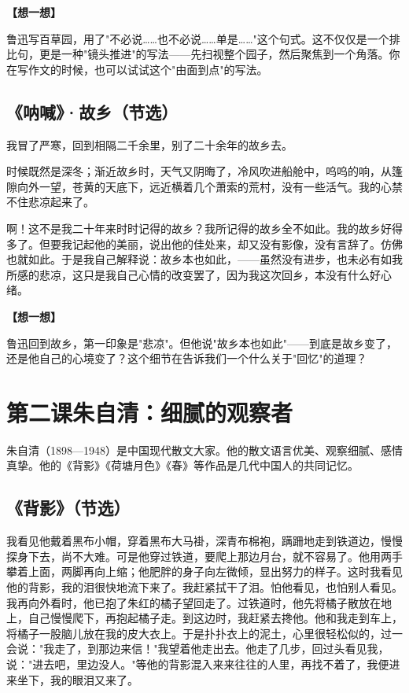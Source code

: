 \documentclass[a4paper,12pt]{ctexart}
\newcommand{\thinkq}{\vspace{0.2cm}\noindent\textcolor{orange!60!black}{\small\bfseries【想一想】}\par}
\begin{document}
\thinkq 鲁迅写百草园，用了"不必说……也不必说……单是……"这个句式。这不仅仅是一个排比句，更是一种"镜头推进"的写法——先扫视整个园子，然后聚焦到一个角落。你在写作文的时候，也可以试试这个"由面到点"的写法。

\subsection*{《呐喊》·故乡（节选）}

我冒了严寒，回到相隔二千余里，别了二十余年的故乡去。

时候既然是深冬；渐近故乡时，天气又阴晦了，冷风吹进船舱中，呜呜的响，从篷隙向外一望，苍黄的天底下，远近横着几个萧索的荒村，没有一些活气。我的心禁不住悲凉起来了。

啊！这不是我二十年来时时记得的故乡？我所记得的故乡全不如此。我的故乡好得多了。但要我记起他的美丽，说出他的佳处来，却又没有影像，没有言辞了。仿佛也就如此。于是我自己解释说：故乡本也如此，——虽然没有进步，也未必有如我所感的悲凉，这只是我自己心情的改变罢了，因为我这次回乡，本没有什么好心绪。

\thinkq 鲁迅回到故乡，第一印象是"悲凉"。但他说"故乡本也如此"——到底是故乡变了，还是他自己的心境变了？这个细节在告诉我们一个什么关于"回忆"的道理？

\newpage

\section{\textcolor{orange!80!black}{第二课\quad 朱自清：细腻的观察者}}

朱自清（1898—1948）是中国现代散文大家。他的散文语言优美、观察细腻、感情真挚。他的《背影》《荷塘月色》《春》等作品是几代中国人的共同记忆。

\subsection*{《背影》（节选）}

我看见他戴着黑布小帽，穿着黑布大马褂，深青布棉袍，蹒跚地走到铁道边，慢慢探身下去，尚不大难。可是他穿过铁道，要爬上那边月台，就不容易了。他用两手攀着上面，两脚再向上缩；他肥胖的身子向左微倾，显出努力的样子。这时我看见他的背影，我的泪很快地流下来了。我赶紧拭干了泪。怕他看见，也怕别人看见。我再向外看时，他已抱了朱红的橘子望回走了。过铁道时，他先将橘子散放在地上，自己慢慢爬下，再抱起橘子走。到这边时，我赶紧去搀他。他和我走到车上，将橘子一股脑儿放在我的皮大衣上。于是扑扑衣上的泥土，心里很轻松似的，过一会说："我走了，到那边来信！"我望着他走出去。他走了几步，回过头看见我，说："进去吧，里边没人。"等他的背影混入来来往往的人里，再找不着了，我便进来坐下，我的眼泪又来了。
\end{document}
